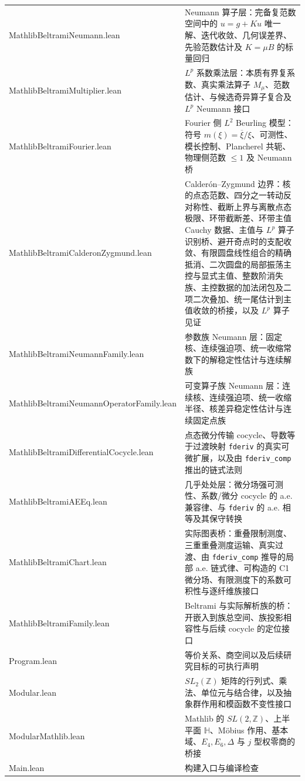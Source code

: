 \documentclass[UTF8,fontset=none,a4paper,11pt]{ctexart}
\begin{document}
\begin{center}
\begin{tabularx}{\textwidth}{>{\ttfamily}lX}
MathlibBeltramiNeumann.lean & Neumann 算子层：完备复范数空间中的 \(u=g+Ku\) 唯一解、迭代收敛、几何误差界、先验范数估计及 \(K=\mu B\) 的标量回归 \\
MathlibBeltramiMultiplier.lean & \(L^p\) 系数乘法层：本质有界复系数、真实乘法算子 \(M_\mu\)、范数估计、与候选奇异算子复合及 \(L^p\) Neumann 接口 \\
MathlibBeltramiFourier.lean & Fourier 侧 \(L^2\) Beurling 模型：符号 \(m(\xi)=\overline{\xi}/\xi\)、可测性、模长控制、Plancherel 共轭、物理侧范数 \(\leq 1\) 及 Neumann 桥 \\
MathlibBeltramiCalderonZygmund.lean & Calderón--Zygmund 边界：核的点态范数、四分之一转动反对称性、截断上界与离散点态极限、环带截断差、环带主值 Cauchy 数据、主值与 \(L^p\) 算子识别桥、避开奇点时的支配收敛、有限圆盘线性组合的精确抵消、二次圆盘的局部振荡主控与显式主值、整数阶消失族、主控数据的加法闭包及二项二次叠加、统一尾估计到主值收敛的桥接，以及 \(L^p\) 算子见证 \\
MathlibBeltramiNeumannFamily.lean & 参数族 Neumann 层：固定核、连续强迫项、统一收缩常数下的解稳定性估计与连续解族 \\
MathlibBeltramiNeumannOperatorFamily.lean & 可变算子族 Neumann 层：连续核、连续强迫项、统一收缩半径、核差异稳定性估计与连续固定点族 \\
MathlibBeltramiDifferentialCocycle.lean & 点态微分传输 cocycle、导数等于过渡映射 \texttt{fderiv} 的真实可微扩展，以及由 \texttt{fderiv\_comp} 推出的链式法则 \\
MathlibBeltramiAEEq.lean & 几乎处处层：微分场强可测性、系数/微分 cocycle 的 a.e. 兼容律、与 \texttt{fderiv} 的 a.e. 相等及其保守转换 \\
MathlibBeltramiChart.lean & 实际图表桥：重叠限制测度、三重重叠测度运输、真实过渡、由 \texttt{fderiv\_comp} 推导的局部 a.e. 链式律、可构造的 C1 微分场、有限测度下的系数可积性与逐纤维族接口 \\
MathlibBeltramiFamily.lean & Beltrami 与实际解析族的桥：开嵌入到族总空间、族投影相容性与后续 cocycle 的定位接口 \\
Program.lean & 等价关系、商空间以及后续研究目标的可执行声明 \\
Modular.lean & $SL_2(\mathbb Z)$ 矩阵的行列式、乘法、单位元与结合律，以及抽象群作用和模函数不变性接口 \\
ModularMathlib.lean & Mathlib 的 $SL(2,\mathbb Z)$、上半平面 $\mathbb H$、Möbius 作用、基本域、$E_4,E_6,\Delta$ 与 $j$ 型权零商的桥接 \\
Main.lean & 构建入口与编译检查 \\
\bottomrule
\end{tabularx}
\normalsize
\end{center}
\end{document}
